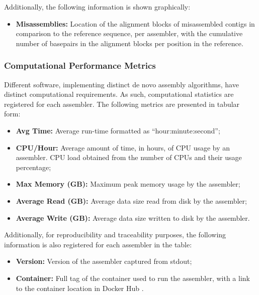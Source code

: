 Additionally, the following information is shown graphically:

\begin{itemize}
    \item \textbf{Misassemblies:} Location of the alignment blocks of misassembled contigs in comparison to the reference sequence, per assembler, with the cumulative number of basepairs in the alignment blocks per position in the reference.
\end{itemize}

\subsubsection{Computational Performance Metrics} \label{ch5_sup_performance_metrics}

Different software, implementing distinct de novo assembly algorithms, have distinct computational requirements. As such, computational statistics are registered for each assembler. The following metrics are presented in tabular form:

\begin{itemize}
    \item \textbf{Avg Time:} Average run-time formatted as “hour:minute:second”;
    \item \textbf{CPU/Hour:} Average amount of time, in hours, of CPU usage by an assembler. CPU load obtained from the number of CPUs and their usage percentage;
    \item \textbf{Max Memory (GB):} Maximum peak memory usage by the assembler;
    \item \textbf{Average Read (GB):} Average data size read from disk by the assembler;
    \item \textbf{Average Write (GB):} Average data size written to disk by the assembler.
\end{itemize}

Additionally, for reproducibility and traceability purposes, the following information is also registered for each assembler in the table:

\begin{itemize}
    \item \textbf{Version:} Version of the assembler captured from stdout;
    \item \textbf{Container:} Full tag of the container used to run the assembler, with a link to the container location in Docker Hub \cite{noauthor_docker_nodate}.
\end{itemize}

